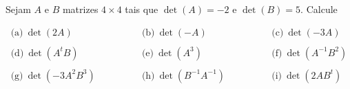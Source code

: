 
\newcommand{\dps}{\displaystyle}

\begin{problem}
Sejam $A$ e $B$ matrizes $4 \times 4$ tais que $\det(A)=-2$ e $\det(B)=5$. Calcule

$$\begin{array}{lllllllllllll}  
\text{(a)}\ \det(2A)         & & & & & &   \text{(b)}\ \det(-A)             & & & & & &   \text{(c)}\ \det(-3A)             \\
                             & & & & & &                                    & & & & & &                                     \\
\text{(d)}\ \det(A^{t}B)     & & & & & &   \text{(e)}\ \det(A^3)            & & & & & &   \text{(f)}\ \det(A^{-1}B^2)       \\
                             & & & & & &                                    & & & & & &                                     \\
\text{(g)}\ \det(-3A^2B^3)   & & & & & &   \text{(h)}\ \det(B^{-1}A^{-1})   & & & & & &   \text{(i)}\ \det(2AB^t)          
\end{array}$$
\end{problem}

